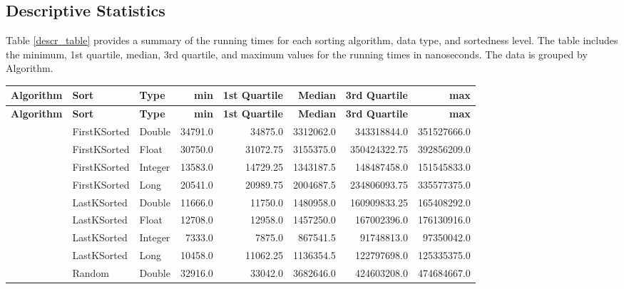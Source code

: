 \documentclass[unicode,11pt,a4paper,oneside,numbers=endperiod,openany]{scrartcl}
\begin{document}
    \subsection{Descriptive Statistics}
    
    Table \ref{descr_table} provides a summary of the running times for each sorting algorithm, data type, and sortedness level. The table includes the minimum, 1st quartile, median, 3rd quartile, and maximum values for the running times in nanoseconds. The data is grouped by Algorithm.\\

    \newpage
    \begin{center}
        \footnotesize
        \begin{longtable}{|l|l|l|r|r|r|r|r|}
            \hline
            \textbf{Algorithm} & \textbf{Sort} & \textbf{Type} & \textbf{min} & \textbf{1st Quartile} & \textbf{Median} & \textbf{3rd Quartile} & \textbf{max} \\
            \hline
            \endfirsthead
            \hline
            \textbf{Algorithm} & \textbf{Sort} & \textbf{Type} & \textbf{min} & \textbf{1st Quartile} & \textbf{Median} & \textbf{3rd Quartile} & \textbf{max} \\
            \hline
            \endhead
            \hline
            \endfoot
            \multirow{16}{*}{BSUNC} & FirstKSorted & Double & 34791.0 & 34875.0 & 3312062.0 & 343318844.0 & 351527666.0 \\
            & FirstKSorted & Float & 30750.0 & 31072.75 & 3155375.0 & 350424322.75 & 392856209.0 \\
            & FirstKSorted & Integer & 13583.0 & 14729.25 & 1343187.5 & 148487458.0 & 151545833.0 \\
            & FirstKSorted & Long & 20541.0 & 20989.75 & 2004687.5 & 234806093.75 & 335577375.0 \\
            & LastKSorted & Double & 11666.0 & 11750.0 & 1480958.0 & 160909833.25 & 165408292.0 \\
            & LastKSorted & Float & 12708.0 & 12958.0 & 1457250.0 & 167002396.0 & 176130916.0 \\
            & LastKSorted & Integer & 7333.0 & 7875.0 & 867541.5 & 91748813.0 & 97350042.0 \\
            & LastKSorted & Long & 10458.0 & 11062.25 & 1136354.5 & 122797698.0 & 125335375.0 \\
            & Random & Double & 32916.0 & 33042.0 & 3682646.0 & 424603208.0 & 474684667.0 \\

\end{longtable}
\end{center}
\end{document}
